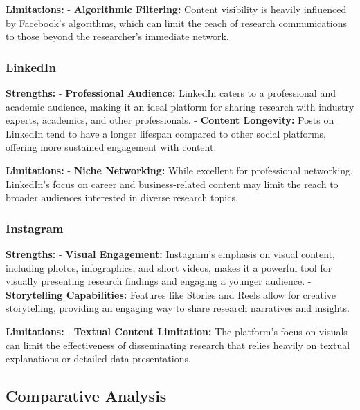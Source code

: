 \documentclass[
]{book}
\begin{document}
\textbf{Limitations:}
- \textbf{Algorithmic Filtering:} Content visibility is heavily influenced by Facebook's algorithms, which can limit the reach of research communications to those beyond the researcher's immediate network.

\hypertarget{linkedin}{%
\subsubsection*{LinkedIn}\label{linkedin}}

\textbf{Strengths:}
- \textbf{Professional Audience:} LinkedIn caters to a professional and academic audience, making it an ideal platform for sharing research with industry experts, academics, and other professionals.
- \textbf{Content Longevity:} Posts on LinkedIn tend to have a longer lifespan compared to other social platforms, offering more sustained engagement with content.

\textbf{Limitations:}
- \textbf{Niche Networking:} While excellent for professional networking, LinkedIn's focus on career and business-related content may limit the reach to broader audiences interested in diverse research topics.

\hypertarget{instagram}{%
\subsubsection*{Instagram}\label{instagram}}

\textbf{Strengths:}
- \textbf{Visual Engagement:} Instagram's emphasis on visual content, including photos, infographics, and short videos, makes it a powerful tool for visually presenting research findings and engaging a younger audience.
- \textbf{Storytelling Capabilities:} Features like Stories and Reels allow for creative storytelling, providing an engaging way to share research narratives and insights.

\textbf{Limitations:}
- \textbf{Textual Content Limitation:} The platform's focus on visuals can limit the effectiveness of disseminating research that relies heavily on textual explanations or detailed data presentations.

\hypertarget{comparative-analysis}{%
\subsection*{Comparative Analysis}\label{comparative-analysis}}
\end{document}
